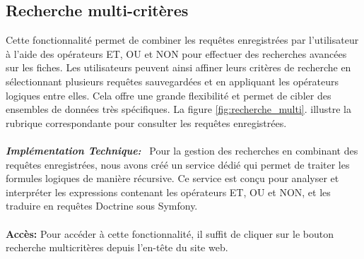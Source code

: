 \documentclass[12pt]{article}
\begin{document}
    \subsection{Recherche multi-critères}
    Cette fonctionnalité permet de combiner les requêtes enregistrées par l'utilisateur à l'aide des opérateurs ET, OU et NON pour effectuer des recherches avancées sur les fiches. Les utilisateurs peuvent ainsi affiner leurs critères de recherche en sélectionnant plusieurs requêtes sauvegardées et en appliquant les opérateurs logiques entre elles. Cela offre une grande flexibilité et permet de cibler des ensembles de données très spécifiques. La figure \ref{fig:recherche_multi}. illustre la rubrique correspondante pour consulter les requêtes enregistrées.
    \\
    \\
    \textit{\textbf{Implémentation Technique:}} \ Pour la gestion des recherches en combinant des requêtes enregistrées, nous avons créé un service dédié qui permet de traiter les
    formules logiques de manière récursive. Ce service est conçu pour analyser
    et interpréter les expressions contenant les opérateurs ET, OU et NON, et
    les traduire en requêtes Doctrine sous Symfony.\\
    \\
    \textbf{Accès:} Pour accéder à cette fonctionnalité, il suffit de cliquer sur le bouton recherche multicritères depuis l'en-tête du site web.
\end{document}
